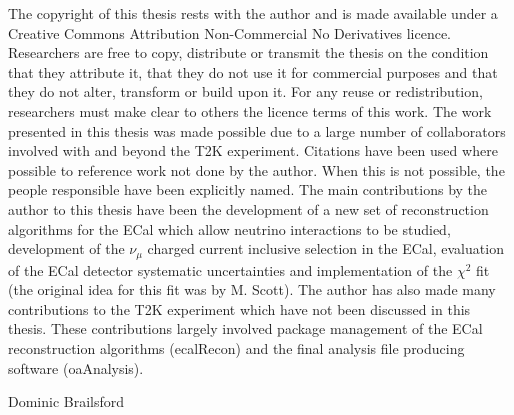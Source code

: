 \begin{declaration}
The copyright of this thesis rests with the author and is made available under a Creative Commons Attribution Non-Commercial No Derivatives licence. Researchers are free to copy, distribute or transmit the thesis on the condition that they attribute it, that they do not use it for commercial purposes and that they do not alter, transform or build upon it. For any reuse or redistribution, researchers must make clear to others the licence terms of this work.
\newline
\newline
The work presented in this thesis was made possible due to a large number of collaborators involved with and beyond the T2K experiment.  Citations have been used where possible to reference work not done by the author.  When this is not possible, the people responsible have been explicitly named.
\newline
\newline
The main contributions by the author to this thesis have been the development of a new set of reconstruction algorithms for the ECal which allow neutrino interactions to be studied, development of the $\nu_\mu$ charged current inclusive selection in the ECal, evaluation of the ECal detector systematic uncertainties and implementation of the $\chi^2$ fit (the original idea for this fit was by M. Scott).
\newline
\newline
The author has also made many contributions to the T2K experiment which have not been discussed in this thesis.  These contributions largely involved package management of the ECal reconstruction algorithms (ecalRecon) and the final analysis file producing software (oaAnalysis).
  \vspace*{1cm}
  \begin{flushright}
    Dominic Brailsford
  \end{flushright}
\end{declaration}


